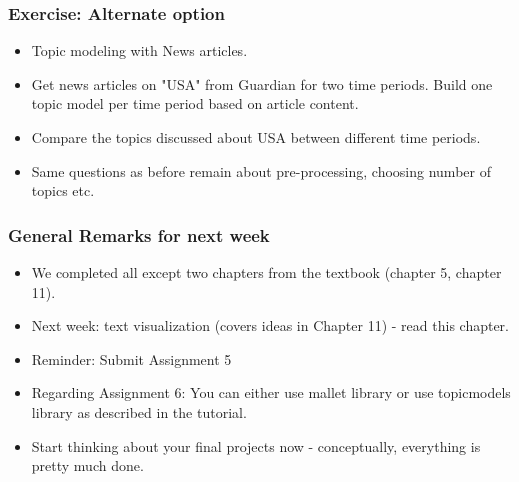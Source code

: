\documentclass{beamer}
\begin{document}
\begin{frame}
\frametitle{Exercise: Alternate option}
\begin{itemize}
\item Topic modeling with News articles.
\item Get news articles on "USA" from Guardian for two time periods. Build one topic model per time period based on article content.
\item Compare the topics discussed about USA between different time periods.
\item Same questions as before remain about pre-processing, choosing number of topics etc. 
\end{itemize}
\end{frame}

\begin{frame}
\frametitle{General Remarks for next week}
\begin{itemize}
\item We completed all except two chapters from the textbook (chapter 5, chapter 11).
\item Next week: text visualization (covers ideas in Chapter 11) - read this chapter. 
\item Reminder: Submit Assignment 5 
\item Regarding Assignment 6: You can either use mallet library or use topicmodels library as described in the tutorial. 
\item Start thinking about your final projects now - conceptually, everything is pretty much done.
\end{itemize}
\end{frame}
\end{document}
